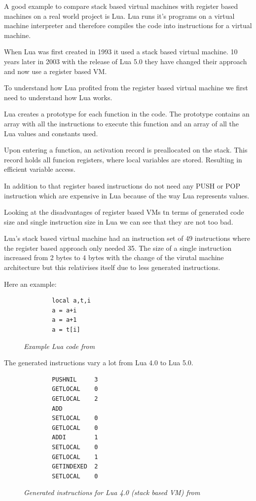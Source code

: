 \documentclass{article}
\begin{document}
A good example to compare stack based virtual machines with register based
machines on a real world project is Lua. Lua runs it's programs on a virtual
machine interpreter and therefore compiles the code into instructions for a
virtual machine.

When Lua was first created in 1993 it used a stack based virtual machine. 10
years later in 2003 with the release of Lua 5.0 they have changed their
approach and now use a register based VM. ~\cite{lua_implementation}

To understand how Lua profited from the register based virtual machine we first
need to understand how Lua works.

Lua creates a prototype for each function in the code. The prototype contains an
array with all the instructions to execute this function and an array of all the
Lua values and constants used. ~\cite{lua_implementation}

Upon entering a function, an activation record is preallocated on the stack.
This record holds all funcion registers, where local variables are stored.
Resulting in efficient variable access. ~\cite{lua_implementation}

In addition to that register based instructions do not need any PUSH or POP
instruction which are expensive in Lua because of the way Lua represents
values.

Looking at the disadvantages of register based VMs tn terms of generated code
size and single instruction size in Lua we can see that they are not too bad.

Lua's stack based virtual machine had an instruction set of 49 instructions
where the register based approach only needed 35. The size of a single
instruction increased from 2 bytes to 4 bytes with the change of the virutal
machine architecture but this relativises itself due to less generated
instructions.

Here an example:

\begin{figure}[ht]
    \begin{verbatim}
        local a,t,i
        a = a+i
        a = a+1
        a = t[i]
    \end{verbatim}
    \caption{\textit{Example Lua code from ~\cite{lua_implementation}}}
    \label{fig:lua_code}
\end{figure}

The generated instructions vary a lot from Lua 4.0 to Lua 5.0.

\begin{figure}[ht]
    \begin{verbatim}
        PUSHNIL     3
        GETLOCAL    0
        GETLOCAL    2
        ADD
        SETLOCAL    0
        GETLOCAL    0
        ADDI        1
        SETLOCAL    0
        GETLOCAL    1
        GETINDEXED  2
        SETLOCAL    0
    \end{verbatim}
    \caption{\textit{Generated instructions for Lua 4.0 (stack based VM) from ~\cite{lua_implementation}}}
    \label{fig:lua_generated4}
\end{figure}
\end{document}

